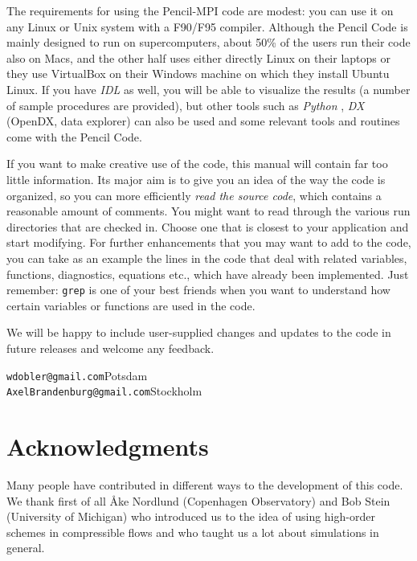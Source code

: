 \documentclass[\mydriver,12pt,twoside,notitlepage,a4paper]{article}
\makeatletter
\newcommand{\code}[1]{\texttt{#1}}
\newcommand{\cmd}{\command}
\newcommand{\email}[1]{\code{#1}}
\newcommand{\command}[2][]{%
  \def\index@{#1}%
  \code{#2}%
  \ifx\index@\@empty\index{#2@\emph{#2}}%
  \else\index{#1@\emph{#1}}%
  \fi%
}
\newcommand{\name}[2][]{%
  \def\index@{#1}%
  \textsl{#2\/}%
  \ifx\index@\@empty\index{#2@\MakeUppercase #2}%
  \else\index{#1}%
  \fi%
}
\makeatother
\begin{document}
The requirements for using the Pencil-MPI code are modest: you can use it
on any Linux or Unix system with a F90/F95 compiler.
Although the {\sc Pencil Code} is mainly designed to run on supercomputers,
about 50\% of the users run their code also on Macs, and the other half
uses either directly Linux on their laptops or they use VirtualBox
on their Windows machine on which they install Ubuntu Linux.
If you have \name{IDL} as
well, you will be able to visualize the results (a number of sample
procedures are provided), but other tools such as
\name{Python}, \name{DX} (OpenDX, data explorer) can also be used
and some relevant tools and routines come with the {\sc Pencil Code}.

\bigskip

If you want to make creative use of the code, this manual will contain far
too little information.
Its major aim is to give you an idea of the way the code is organized, so
you can more efficiently \emph{read the source code}, which contains a
reasonable amount of comments.
You might want to read through the various run directories that are checked in.
Choose one that is closest to your application and start modifying.
For further enhancements that you may want to add to the code, you can
take as an example the lines in the code that deal with related variables,
functions, diagnostics, equations etc., which have already been implemented.
Just remember: \cmd{grep} is one of your best friends when you want to
understand how certain variables or functions are used in the code.

\bigskip

We will be happy to include user-supplied changes and updates to the code
in future releases and welcome any feedback.

\vspace{5mm}
\email{wdobler@gmail.com}\hfill Potsdam\\
\email{AxelBrandenburg@gmail.com}\hfill Stockholm


\section*{Acknowledgments}

Many people have contributed in different ways to the development of this
code. We thank first of all {\AA}ke Nordlund (Copenhagen Observatory)
and Bob Stein (University of Michigan) who introduced us to the idea of
using high-order schemes in compressible flows and who taught us a lot
about simulations in general.
\end{document}
